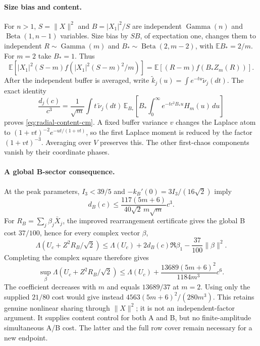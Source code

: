 \paragraph{Size bias and content.}
For $n>1$, $S=\|X\|^2$ and $B=|X_1|^2/S$ are independent
$\operatorname{Gamma}(n)$ and $\operatorname{Beta}(1,n-1)$ variables.
Size bias by $SB$, of expectation one, changes them to independent
$R\sim\operatorname{Gamma}(m)$ and
$B_*\sim\operatorname{Beta}(2,m-2)$, with $\mathbb EB_*=2/m$.
For $m=2$ take $B_*=1$.
Thus
\[
 \mathbb E[|X_1|^2(S-m)f(|X_1|^2(S-m)^2/m)]
 =\mathbb E[(R-m)f(B_*Z_m(R))].
\]
After the independent buffer is averaged, write
$\widetilde k_j(u)=\int e^{-tu}\widetilde\nu_j(dt)$. The exact identity
\[
 \frac{d_j(c)}{c^3}
 =\frac1{\sqrt m}\int t\,\widetilde\nu_j(dt)
 \,\mathbb E_{B_*}\!
 \left[B_*\int_0^\infty e^{-tc^2B_*u}H_m(u)\,du\right]
\]
proves \eqref{eq:radial-content-cm}. A fixed buffer variance $v$
changes the Laplace atom to
$(1+vt)^{-2}e^{-ut/(1+vt)}$, so the first Laplace moment is reduced
by the factor $(1+vt)^{-3}$. Averaging over $V$ preserves this.
The other first-chaos components vanish by their coordinate phases.

\paragraph{A global B-sector consequence.}
At the peak parameters, $I_3<39/5$ and
$-k_B'(0)=3I_3/(16\sqrt2)$ imply
\[
 d_B(c)\le\frac{117(5m+6)}{40\sqrt2\,m\sqrt m}c^3.
\]
For $R_B=\sum_j\beta_j\bar X_j$, the improved rearrangement certificate
gives the global B cost $37/100$, hence for every complex vector $\beta$,
\[
 \Lambda(U_c+Z^2R_B/\sqrt2)
 \le\Lambda(U_c)+2d_B(c)\Re\beta_1
 -\frac{37}{100}\|\beta\|^2.
\]
Completing the complex square therefore gives
\[
 \boxed{\sup_\beta\Lambda(U_c+Z^2R_B/\sqrt2)
 \le\Lambda(U_c)+\frac{13689(5m+6)^2}{1184m^3}c^6.}
\]
The coefficient decreases with $m$ and equals $13689/37$ at $m=2$.
Using only the supplied $21/80$ cost would give instead
$4563(5m+6)^2/(280m^3)$.
This retains genuine nonlinear sharing through $\|X\|^2$; it is not an
independent-factor argument. It supplies content control for both A and
B, but no finite-amplitude simultaneous A/B cost. The latter and the
full row cover remain necessary for a new endpoint.

